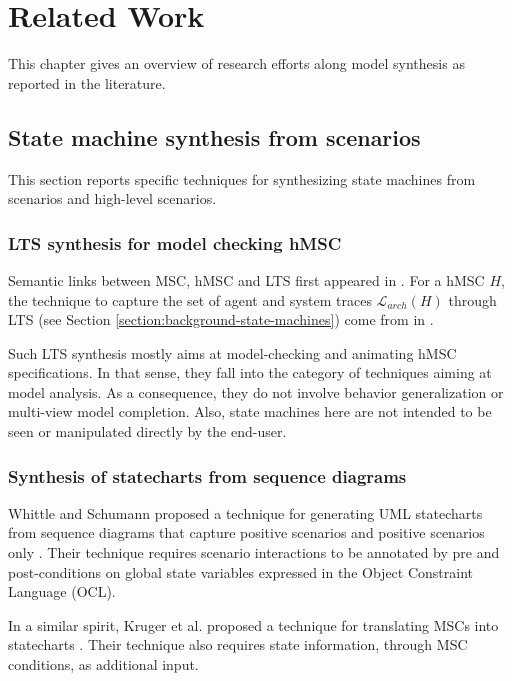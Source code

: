 \chapter{Related Work\label{chapter:discussion}}

This chapter gives an overview of research efforts along model synthesis as reported in the literature. 


\section{State machine synthesis from scenarios\label{section:related-state-machines-from-scenarios}}

This section reports specific techniques for synthesizing state machines from scenarios and high-level scenarios.

\subsection*{LTS synthesis for model checking hMSC}

Semantic links between MSC, hMSC and LTS first appeared in \cite{Uchitel:2001, Uchitel:2001b}. For a hMSC $H$, the technique to capture the set of agent and system traces $\mathcal{L}_{arch}(H)$ through LTS (see Section \ref{section:background-state-machines}) come from in \cite{Uchitel:2003}. 

Such LTS synthesis mostly aims at model-checking and animating hMSC specifications. In that sense, they fall into the category of techniques aiming at model analysis. As a consequence, they do not involve behavior generalization or multi-view model completion.  Also, state machines here are not intended to be seen or manipulated directly by the end-user.

\subsection*{Synthesis of statecharts from sequence diagrams}

Whittle and Schumann proposed a technique for generating UML statecharts from sequence diagrams that capture positive scenarios and positive scenarios only \cite{Whittle:2000}. Their technique requires scenario interactions to be annotated by pre and post-conditions on global state variables expressed in the Object Constraint Language (OCL). 

In a similar spirit, Kruger et al. proposed a technique for translating MSCs into statecharts \cite{Kruger:2000}. Their technique
also requires state information, through MSC conditions, as additional input.

